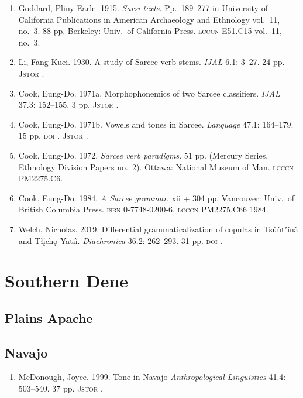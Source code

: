 \documentclass[12pt,letterpaper,oneside,article]{memoir}
\begin{document}
\begin{enumerate}
\item	Goddard, Pliny Earle.
	1915.
	\textit{Sarsi texts}.
	Pp.\ 189–277 in University of California Publications in American Archaeology
		and Ethnology vol.\ 11, no.\ 3.
	88 pp.
	Berkeley: Univ.\ of California Press.
	\textsc{lcccn} E51.C15 vol.\ 11, no.\ 3.
\item	Li, Fang-Kuei.
	1930.
	A study of Sarcee verb-stems.
	\textit{IJAL} 6.1: 3–27.
	24 pp.
	\textsc{Jstor} .
\item	Cook, Eung-Do.
	1971a.
	Morphophonemics of two Sarcee classifiers.
	\textit{IJAL} 37.3: 152–155.
	3 pp.
	\textsc{Jstor} .
\item	Cook, Eung-Do.
	1971b.
	Vowels and tones in Sarcee.
	\textit{Language} 47.1: 164–179.
	15 pp.
	\textsc{doi} .
	\textsc{Jstor} .
\item	Cook, Eung-Do.
	1972.
	\textit{Sarcee verb paradigms}.
	51 pp.
	(Mercury Series, Ethnology Division Papers no.\ 2).
	Ottawa: National Museum of Man.
	\textsc{lcccn} PM2275.C6.
\item	Cook, Eung-Do.
	1984.
	\textit{A Sarcee grammar}.
	xii + 304 pp.
	Vancouver: Univ.\ of British Columbia Press.
	\textsc{isbn} 0-7748-0200-6.
	\textsc{lcccn} PM2275.C66 1984.
\item	Welch, Nicholas.
	2019.
	Differential grammaticalization of copulas in Tsúùtʼínà and Tłįchǫ Yatiì.
	\textit{Diachronica} 36.2: 262–293.
	31 pp.
	\textsc{doi} .
\end{enumerate}

\section{Southern Dene}\label{sec:southern}

\subsection{Plains Apache}\label{sec:plainsapache}

\subsection{Navajo}\label{sec:navajo}

\begin{enumerate}
\item	McDonough, Joyce.
	1999.
	Tone in Navajo
	\textit{Anthropological Linguistics} 41.4: 503–540.
	37 pp.
	\textsc{Jstor} .
\end{enumerate}
\end{document}
